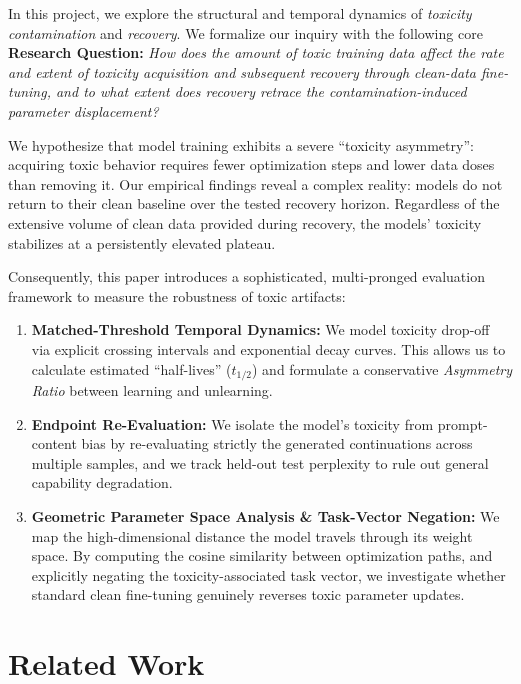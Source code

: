 \documentclass[11pt,a4paper]{article}
\begin{document}
In this project, we explore the structural and temporal dynamics of \textit{toxicity contamination} and \textit{recovery}. We formalize our inquiry with the following core \textbf{Research Question:} \textit{How does the amount of toxic training data affect the rate and extent of toxicity acquisition and subsequent recovery through clean-data fine-tuning, and to what extent does recovery retrace the contamination-induced parameter displacement?}

We hypothesize that model training exhibits a severe ``toxicity asymmetry'': acquiring toxic behavior requires fewer optimization steps and lower data doses than removing it. Our empirical findings reveal a complex reality: models do not return to their clean baseline over the tested recovery horizon. Regardless of the extensive volume of clean data provided during recovery, the models' toxicity stabilizes at a persistently elevated plateau.

Consequently, this paper introduces a sophisticated, multi-pronged evaluation framework to measure the robustness of toxic artifacts:
\begin{enumerate}
    \item \textbf{Matched-Threshold Temporal Dynamics:} We model toxicity drop-off via explicit crossing intervals and exponential decay curves. This allows us to calculate estimated ``half-lives'' ($t_{1/2}$) and formulate a conservative \textit{Asymmetry Ratio} between learning and unlearning.
    \item \textbf{Endpoint Re-Evaluation:} We isolate the model's toxicity from prompt-content bias by re-evaluating strictly the generated continuations across multiple samples, and we track held-out test perplexity to rule out general capability degradation.
    \item \textbf{Geometric Parameter Space Analysis \& Task-Vector Negation:} We map the high-dimensional distance the model travels through its weight space. By computing the cosine similarity between optimization paths, and explicitly negating the toxicity-associated task vector, we investigate whether standard clean fine-tuning genuinely reverses toxic parameter updates.
\end{enumerate}

\section{Related Work}
\end{document}
